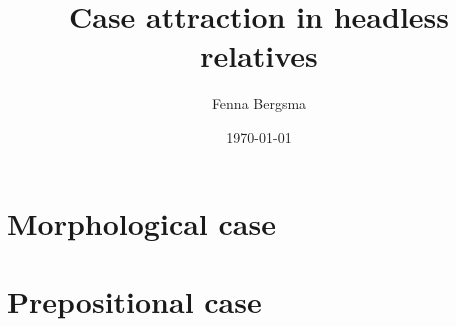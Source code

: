 \documentclass{memoir}
\title{Case attraction in headless relatives}
\author{Fenna Bergsma}
\date{\today}
\begin{document}
\maketitle

\tableofcontents

\part{Morphological case}


\part{Prepositional case}

\printbibliography
\end{document}
